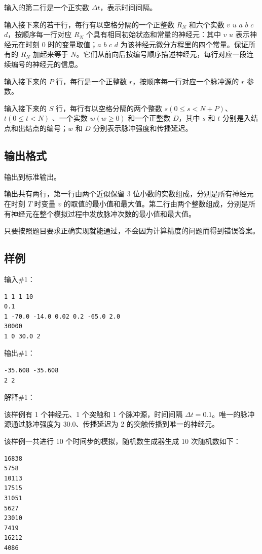 输入的第二行是一个正实数 $\Delta{t}$，表示时间间隔。

输入接下来的若干行，每行有以空格分隔的一个正整数 $R_N$ 和六个实数 $v$ $u$ $a$ $b$ $c$ $d$，按顺序每一行对应 $R_N$ 个具有相同初始状态和常量的神经元：其中 $v$ $u$ 表示神经元在时刻 0 时的变量取值；$a$ $b$ $c$ $d$ 为该神经元微分方程里的四个常量。保证所有的 $R_N$ 加起来等于 $N$。它们从前向后按编号顺序描述神经元，每行对应一段连续编号的神经元的信息。

输入接下来的 $P$ 行，每行是一个正整数 $r$，按顺序每一行对应一个脉冲源的 $r$ 参数。

输入接下来的 $S$ 行，每行有以空格分隔的两个整数 $s(0 \le s < N+P)$、$t(0 \le t < N)$ 、一个实数 $w(w \ge 0)$ 和一个正整数 $D$，其中 $s$ 和 $t$ 分别是入结点和出结点的编号；$w$ 和 $D$ 分别表示脉冲强度和传播延迟。

\subsection*{输出格式}

输出到标准输出。

输出共有两行，第一行由两个近似保留 3 位小数的实数组成，分别是所有神经元在时刻 $T$ 时变量 $v$ 的取值的最小值和最大值。第二行由两个整数组成，分别是所有神经元在整个模拟过程中发放脉冲次数的最小值和最大值。

只要按照题目要求正确实现就能通过，不会因为计算精度的问题而得到错误答案。

\subsection*{样例}

输入\#1：

\begin{lstlisting}
1 1 1 10
0.1
1 -70.0 -14.0 0.02 0.2 -65.0 2.0
30000
1 0 30.0 2
\end{lstlisting}

输出\#1：

\begin{lstlisting}
-35.608 -35.608
2 2
\end{lstlisting}

解释\#1：

该样例有 1 个神经元、1 个突触和 1 个脉冲源，时间间隔 $\Delta{t}=0.1$。唯一的脉冲源通过脉冲强度为 30.0、传播延迟为 2 的突触传播到唯一的神经元。

该样例一共进行 10 个时间步的模拟，随机数生成器生成 10 次随机数如下：

\begin{lstlisting}
16838
5758
10113
17515
31051
5627
23010
7419
16212
4086
\end{lstlisting}

